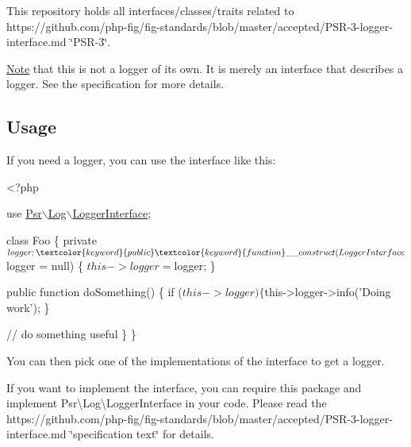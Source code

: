 This repository holds all interfaces/classes/traits related to https\+://github.com/php-\/fig/fig-\/standards/blob/master/accepted/\+P\+S\+R-\/3-\/logger-\/interface.\+md \char`\"{}\+P\+S\+R-\/3\char`\"{}.

\mbox{\hyperlink{class_note}{Note}} that this is not a logger of its own. It is merely an interface that describes a logger. See the specification for more details.

\subsection*{Usage }

If you need a logger, you can use the interface like this\+:


\begin{DoxyCode}
<?php

use \mbox{\hyperlink{namespace_psr_1_1_log_1_1_logger_interface}{Psr\(\backslash\)Log\(\backslash\)LoggerInterface}};

\textcolor{keyword}{class }Foo
\{
    \textcolor{keyword}{private} $logger;

    \textcolor{keyword}{public} \textcolor{keyword}{function} \_\_construct(LoggerInterface $logger = null)
    \{
        $this->logger = $logger;
    \}

    \textcolor{keyword}{public} \textcolor{keyword}{function} doSomething()
    \{
        \textcolor{keywordflow}{if} ($this->logger) \{
            $this->logger->info(\textcolor{stringliteral}{'Doing work'});
        \}

        \textcolor{comment}{// do something useful}
    \}
\}
\end{DoxyCode}


You can then pick one of the implementations of the interface to get a logger.

If you want to implement the interface, you can require this package and implement {\ttfamily Psr\textbackslash{}Log\textbackslash{}Logger\+Interface} in your code. Please read the https\+://github.com/php-\/fig/fig-\/standards/blob/master/accepted/\+P\+S\+R-\/3-\/logger-\/interface.\+md \char`\"{}specification text\char`\"{} for details. 